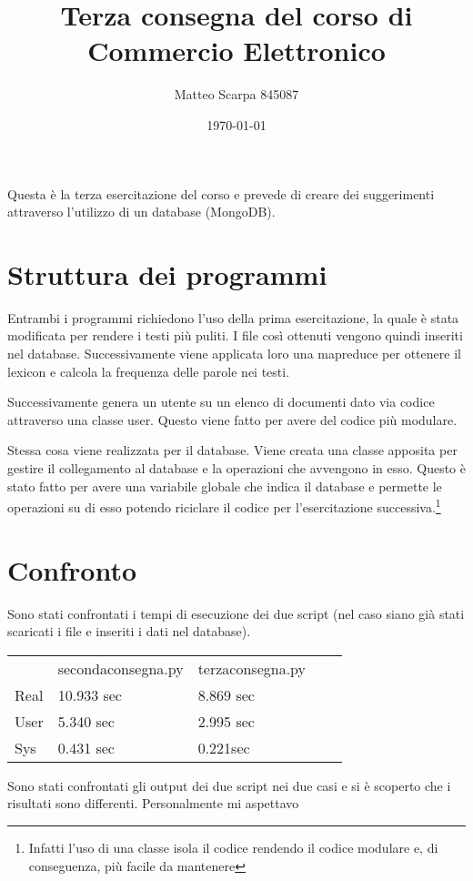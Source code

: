 \documentclass[a4paper]{article}
\title{Terza consegna del corso di Commercio Elettronico}
\author{Matteo Scarpa 845087}
\date{\today}
\begin{document}
	\maketitle
	
	Questa è la terza esercitazione del corso e prevede di creare dei suggerimenti attraverso l'utilizzo di un database (MongoDB). 
	
	\section*{Struttura dei programmi}
	Entrambi i programmi richiedono l'uso della prima esercitazione, la quale è stata modificata per rendere i testi più puliti.  I file così ottenuti vengono quindi inseriti nel database. Successivamente viene applicata loro una mapreduce per ottenere il lexicon e calcola la frequenza delle parole nei testi.
	
Successivamente genera un utente su un elenco di documenti dato	via codice attraverso una classe user. Questo viene fatto per avere del codice più modulare.

Stessa cosa viene realizzata per il database. Viene creata una classe apposita per gestire il collegamento al database e la operazioni che avvengono in esso. Questo è stato fatto per avere una variabile globale che indica il database e permette le operazioni su di esso potendo riciclare il codice per l'esercitazione successiva.\footnote{Infatti l'uso di una classe isola il codice rendendo il codice modulare e, di conseguenza, più facile da mantenere}
			
	\section*{Confronto}
	Sono stati confrontati i tempi di esecuzione dei due script (nel caso siano già stati scaricati i file e inseriti i dati nel database).
\begin{table}[h]
\begin{tabular}{|l|l|l|ll}
\cline{1-3}
 & secondaconsegna.py & terzaconsegna.py &  &  \\ \cline{1-3}
Real & 10.933 sec & 8.869 sec&  &  \\ \cline{1-3}
User & 5.340 sec & 2.995 sec&  &  \\ \cline{1-3}
Sys & 0.431 sec & 0.221sec &  &  \\ \cline{1-3}
\end{tabular}
\end{table}

Sono stati confrontati gli output dei due script nei due casi e si è scoperto che i risultati sono differenti. Personalmente mi aspettavo 
\end{document}
